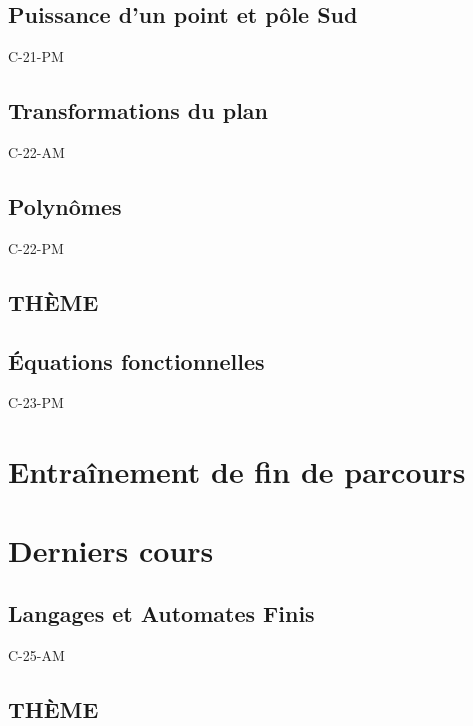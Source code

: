 \documentclass[poly,trombi]{valbonne}
\begin{document}

\subsection{Puissance d'un point et pôle Sud}

{C-21-PM}

\subsection{Transformations du plan}

{C-22-AM}

\subsection{Polynômes}

{C-22-PM}

\subsection{THÈME}


\subsection{Équations fonctionnelles}

{C-23-PM}


\section{Entraînement de fin de parcours}



\section{Derniers cours}

\subsection{Langages et Automates Finis}

{C-25-AM}

\subsection{THÈME}
\end{document}
